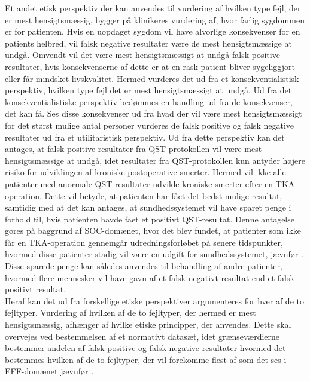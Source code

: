 Et andet etisk perspektiv der kan anvendes til vurdering af hvilken type fejl, der er mest hensigtsmæssig, bygger på klinikeres vurdering af, hvor farlig sygdommen er for patienten. Hvis en uopdaget sygdom vil have alvorlige konsekvenser for en patients helbred, vil falsk negative resultater være de mest hensigtsmæssige at undgå. Omvendt vil det være mest hensigtsmæssigt at undgå falsk positive resultater, hvis konsekvenserne af dette er at en rask patient bliver sygeliggjort eller får mindsket livskvalitet. \citep{Kraemer2011} Hermed vurderes det ud fra et konsekventialistisk perspektiv, hvilken type fejl det er mest hensigtsmæssigt at undgå. Ud fra det konsekventialistiske perspektiv bedømmes en handling ud fra de konsekvenser, det kan få. Ses disse konsekvenser ud fra hvad der vil være mest hensigtsmæssigt for det størst mulige antal personer vurderes de falsk positive og falsk negative resultater ud fra et utilitaristisk perspektiv. \citep{Kraemer2011} Ud fra dette perspektiv kan det antages, at falsk positive resultater fra QST-protokollen vil være mest hensigtsmæssige at undgå, idet resultater fra QST-protokollen kun antyder højere risiko for udviklingen af kroniske postoperative smerter. Hermed vil ikke alle patienter med anormale QST-resultater udvikle kroniske smerter efter en TKA-operation. Dette vil betyde, at patienten har fået det bedst mulige resultat, samtidig med at det kan antages, at sundhedssystemet vil have sparet penge i forhold til, hvis patienten havde fået et positivt QST-resultat. Denne antagelse gøres på baggrund af SOC-domænet, hvor det blev fundet, at patienter som ikke får en TKA-operation gennemgår udredningsforløbet på senere tidspunkter, hvormed disse patienter stadig vil være en udgift for sundhedssystemet, jævnfør . Disse sparede penge kan således anvendes til behandling af andre patienter, hvormed flere mennesker vil have gavn af et falsk negativt resultat end et falsk positivt resultat. \\
Heraf kan det ud fra forskellige etiske perspektiver argumenteres for hver af de to fejltyper. Vurdering af hvilken af de to fejltyper, der hermed er mest hensigtsmæssig, afhænger af hvilke etiske principper, der anvendes. Dette skal overvejes ved bestemmelsen af et normativt datasæt, idet grænseværdierne bestemmer andelen af falsk positive og falsk negative resultater hvormed det bestemmes hvilken af de to fejltyper, der vil forekomme flest af som det ses i EFF-domænet jævnfør .  

